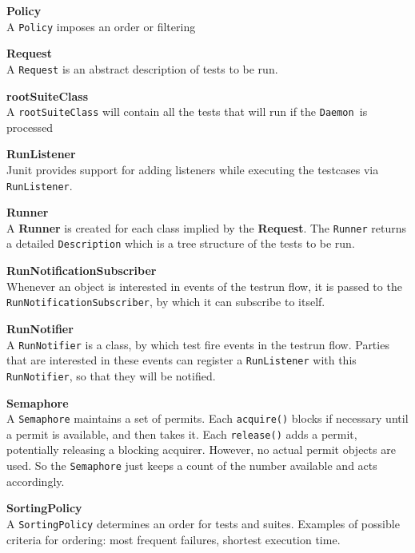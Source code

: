 \documentclass[i2]{oss}
\newcommand{\class}[1]{\texttt{#1}}
\newcommand{\method}[1]{\texttt{#1}}
\newcommand{\Daemon}{\class{Daemon  }}
\newcommand{\gloss}[1]{\textbf{#1}}
\begin{document}
\begin{description}
\item \gloss{Policy} \\
A \class{Policy} imposes an order or filtering 

\item \gloss{Request} \\
A \class{Request} is an abstract description of tests to be run. 

\item \gloss{rootSuiteClass}\\
A \class{rootSuiteClass} will contain all the tests that will run if the \Daemon is processed

\item \gloss{RunListener} \\
Junit provides support for adding listeners while executing the testcases via \class{RunListener}. 

\item \gloss{Runner} \\  A \gloss{Runner} is created for each class implied by the \gloss{Request}. The \class{Runner} returns a detailed \class{Description} which is a tree structure of the tests to be run.

\item \gloss{RunNotificationSubscriber} \\
Whenever an object is interested in events of the testrun flow, it is passed to the \class{RunNotificationSubscriber}, by which it can subscribe to itself.


\item \gloss{RunNotifier} \\
A \class{RunNotifier} is a class, by which test fire events in the testrun flow.
Parties that are interested in these events can register a \class{RunListener} with this \class{RunNotifier}, so that they will be notified.

\item \gloss{Semaphore} \\
A \class{Semaphore} maintains a set of permits. Each \method{acquire()} blocks if necessary until a permit is available, and then takes it. Each \method{release()} adds a permit, potentially releasing a blocking acquirer. However, no actual permit objects are used. So the \class{Semaphore} just keeps a count of the number available and acts accordingly.

\item \gloss{SortingPolicy}\\
 A \class{SortingPolicy} determines an order for tests and suites. Examples of possible criteria for ordering: most frequent failures, shortest execution time.


\end{description}
\end{document}
